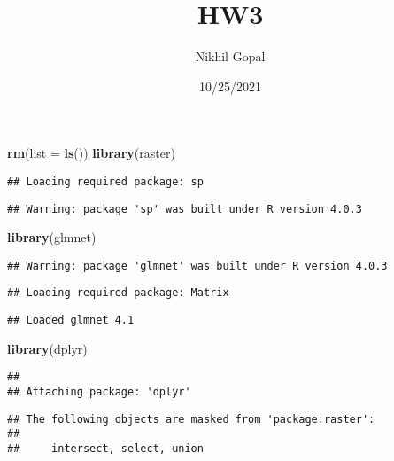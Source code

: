 \documentclass[
]{article}
\title{HW3}
\author{Nikhil Gopal}
\date{10/25/2021}
\newenvironment{Shaded}{\begin{snugshade}}{\end{snugshade}}
\newcommand{\DataTypeTok}[1]{\textcolor[rgb]{0.13,0.29,0.53}{#1}}
\newcommand{\KeywordTok}[1]{\textcolor[rgb]{0.13,0.29,0.53}{\textbf{#1}}}
\newcommand{\NormalTok}[1]{#1}
\begin{document}
\maketitle

\begin{Shaded}
\begin{Highlighting}[]
\KeywordTok{rm}\NormalTok{(}\DataTypeTok{list =} \KeywordTok{ls}\NormalTok{())}
\KeywordTok{library}\NormalTok{(raster)}
\end{Highlighting}
\end{Shaded}

\begin{verbatim}
## Loading required package: sp
\end{verbatim}

\begin{verbatim}
## Warning: package 'sp' was built under R version 4.0.3
\end{verbatim}

\begin{Shaded}
\begin{Highlighting}[]
\KeywordTok{library}\NormalTok{(glmnet)}
\end{Highlighting}
\end{Shaded}

\begin{verbatim}
## Warning: package 'glmnet' was built under R version 4.0.3
\end{verbatim}

\begin{verbatim}
## Loading required package: Matrix
\end{verbatim}

\begin{verbatim}
## Loaded glmnet 4.1
\end{verbatim}

\begin{Shaded}
\begin{Highlighting}[]
\KeywordTok{library}\NormalTok{(dplyr)}
\end{Highlighting}
\end{Shaded}

\begin{verbatim}
## 
## Attaching package: 'dplyr'
\end{verbatim}

\begin{verbatim}
## The following objects are masked from 'package:raster':
## 
##     intersect, select, union
\end{verbatim}
\end{document}
